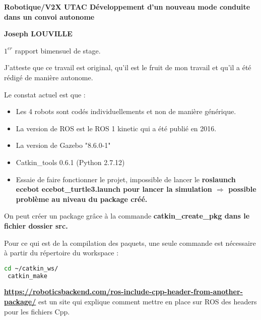\documentclass[a4paper]{report}
\begin{document}
    \begin{titlepage}

        \begin{center}

            \huge{\textbf{Robotique/V2X UTAC Développement d’un nouveau mode conduite dans un convoi autonome}}

            \vspace{2.0cm}

            \normalsize\textbf{Joseph LOUVILLE}

            \vfill

            \LARGE $1^{er}$ rapport bimensuel de stage.
            \vspace{5cm}

            \large J'atteste que ce travail est original, qu’il est le fruit de mon travail et qu’il a été rédigé de manière autonome.

            \vspace{1cm}


        \end{center}



    \end{titlepage}

    Le constat actuel est que :
    \begin{itemize}
        \item Les 4 robots sont codés individuellements et non de manière générique.
        \item La version de ROS est le ROS 1 kinetic qui a été publié en 2016.
        \item La version de Gazebo "8.6.0-1"
        \item Catkin\_tools 0.6.1 (Python 2.7.12)
        \item Essaie de faire fonctionner le projet, impossible de lancer le \bfseries roslaunch ecebot ecebot\_turtle3.launch \mdseries pour lancer la simulation $\Rightarrow$ possible problème au niveau du package créé.
    \end{itemize}

    \vspace{0.5cm}
    On peut créer un package grâce à la commande \bfseries catkin\_create\_pkg \mdseries dans le fichier dossier src.

    Pour ce qui est de la compilation des paquets, une seule commande est nécessaire à partir du répertoire du workspace :
    \begin{lstlisting}[language=bash]
 cd ~/catkin_ws/
 catkin_make
    \end{lstlisting}
    \textbf{\url{https://roboticsbackend.com/ros-include-cpp-header-from-another-package/}} est un site qui explique comment mettre en place sur ROS des headers pour les fichiers Cpp.
\end{document}
